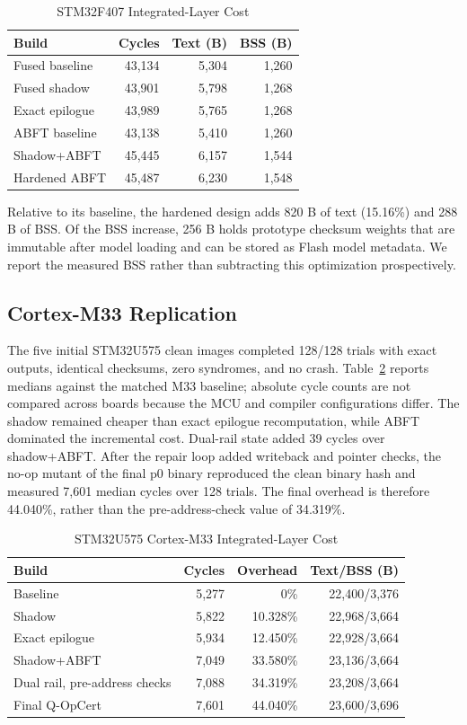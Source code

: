 \documentclass[conference]{IEEEtran}
\begin{document}
\begin{table}[t]
\caption{STM32F407 Integrated-Layer Cost}
\label{tab:cost}
\centering
\begin{tabular}{lrrr}
\toprule
Build & Cycles & Text (B) & BSS (B)\\
\midrule
Fused baseline & 43,134 & 5,304 & 1,260\\
Fused shadow & 43,901 & 5,798 & 1,268\\
Exact epilogue & 43,989 & 5,765 & 1,268\\
ABFT baseline & 43,138 & 5,410 & 1,260\\
Shadow+ABFT & 45,445 & 6,157 & 1,544\\
Hardened ABFT & 45,487 & 6,230 & 1,548\\
\bottomrule
\end{tabular}
\end{table}

Relative to its baseline, the hardened design adds 820 B of text (15.16\%) and 288 B of BSS. Of the BSS increase, 256 B holds prototype checksum weights that are immutable after model loading and can be stored as Flash model metadata. We report the measured BSS rather than subtracting this optimization prospectively.

\subsection{Cortex-M33 Replication}
The five initial STM32U575 clean images completed 128/128 trials with exact outputs, identical checksums, zero syndromes, and no crash. Table~\ref{tab:m33} reports medians against the matched M33 baseline; absolute cycle counts are not compared across boards because the MCU and compiler configurations differ. The shadow remained cheaper than exact epilogue recomputation, while ABFT dominated the incremental cost. Dual-rail state added 39 cycles over shadow+ABFT. After the repair loop added writeback and pointer checks, the no-op mutant of the final p0 binary reproduced the clean binary hash and measured 7,601 median cycles over 128 trials. The final overhead is therefore 44.040\%, rather than the pre-address-check value of 34.319\%.

\begin{table}[t]
\caption{STM32U575 Cortex-M33 Integrated-Layer Cost}
\label{tab:m33}
\centering
\begin{tabular}{lrrr}
\toprule
Build & Cycles & Overhead & Text/BSS (B)\\
\midrule
Baseline & 5,277 & 0\% & 22,400/3,376\\
Shadow & 5,822 & 10.328\% & 22,968/3,664\\
Exact epilogue & 5,934 & 12.450\% & 22,928/3,664\\
Shadow+ABFT & 7,049 & 33.580\% & 23,136/3,664\\
Dual rail, pre-address checks & 7,088 & 34.319\% & 23,208/3,664\\
Final Q-OpCert & 7,601 & 44.040\% & 23,600/3,696\\
\bottomrule
\end{tabular}
\end{table}
\end{document}
